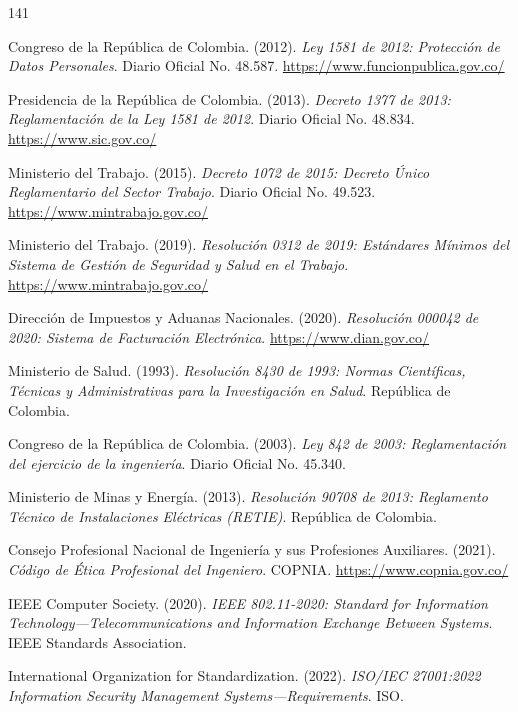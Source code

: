 \begin{thebibliography}{141}

Congreso de la República de Colombia. (2012). \textit{Ley 1581 de 2012: Protección de Datos Personales}. Diario Oficial No. 48.587. \url{https://www.funcionpublica.gov.co/}

Presidencia de la República de Colombia. (2013). \textit{Decreto 1377 de 2013: Reglamentación de la Ley 1581 de 2012}. Diario Oficial No. 48.834. \url{https://www.sic.gov.co/}

Ministerio del Trabajo. (2015). \textit{Decreto 1072 de 2015: Decreto Único Reglamentario del Sector Trabajo}. Diario Oficial No. 49.523. \url{https://www.mintrabajo.gov.co/}

Ministerio del Trabajo. (2019). \textit{Resolución 0312 de 2019: Estándares Mínimos del Sistema de Gestión de Seguridad y Salud en el Trabajo}. \url{https://www.mintrabajo.gov.co/}

Dirección de Impuestos y Aduanas Nacionales. (2020). \textit{Resolución 000042 de 2020: Sistema de Facturación Electrónica}. \url{https://www.dian.gov.co/}

Ministerio de Salud. (1993). \textit{Resolución 8430 de 1993: Normas Científicas, Técnicas y Administrativas para la Investigación en Salud}. República de Colombia.

Congreso de la República de Colombia. (2003). \textit{Ley 842 de 2003: Reglamentación del ejercicio de la ingeniería}. Diario Oficial No. 45.340.

Ministerio de Minas y Energía. (2013). \textit{Resolución 90708 de 2013: Reglamento Técnico de Instalaciones Eléctricas (RETIE)}. República de Colombia.

Consejo Profesional Nacional de Ingeniería y sus Profesiones Auxiliares. (2021). \textit{Código de Ética Profesional del Ingeniero}. COPNIA. \url{https://www.copnia.gov.co/}


IEEE Computer Society. (2020). \textit{IEEE 802.11-2020: Standard for Information Technology—Telecommunications and Information Exchange Between Systems}. IEEE Standards Association.

International Organization for Standardization. (2022). \textit{ISO/IEC 27001:2022 Information Security Management Systems—Requirements}. ISO.


\end{thebibliography}
